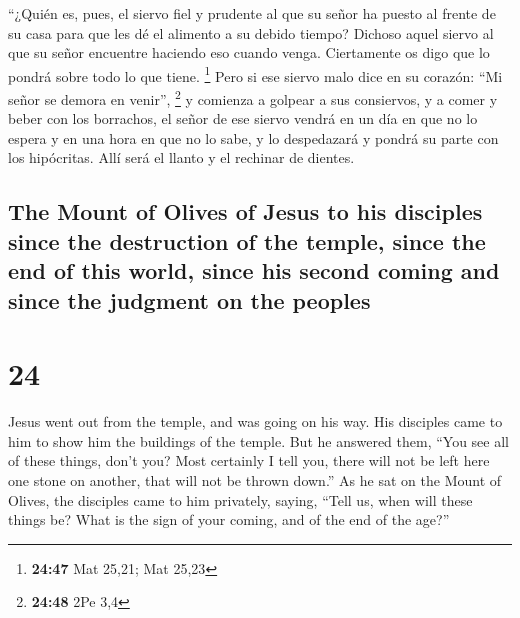 \begin{paracol}{2}
 ``¿Quién es, pues, el siervo fiel y prudente al que su
señor ha puesto al frente de su casa para que les dé el alimento a su
debido tiempo?  Dichoso aquel siervo al que su señor
encuentre haciendo eso cuando venga.  Ciertamente os digo
que lo pondrá sobre todo lo que tiene. \footnote{\textbf{24:47} Mat
  25,21; Mat 25,23}  Pero si ese siervo malo dice en su
corazón: ``Mi señor se demora en venir'', \footnote{\textbf{24:48} 2Pe
  3,4}  y comienza a golpear a sus consiervos, y a comer
y beber con los borrachos,  el señor de ese siervo vendrá
en un día en que no lo espera y en una hora en que no lo sabe,
 y lo despedazará y pondrá su parte con los hipócritas.
Allí será el llanto y el rechinar de dientes.

\switchcolumn
\begin{otherlanguage}{english}

\hypertarget{the-mount-of-olives-of-jesus-to-his-disciples-since-the-destruction-of-the-temple-since-the-end-of-this-world-since-his-second-coming-and-since-the-judgment-on-the-peoples}{%
\subsection{The Mount of Olives of Jesus to his disciples since the
destruction of the temple, since the end of this world, since his second
coming and since the judgment on the
peoples}\label{the-mount-of-olives-of-jesus-to-his-disciples-since-the-destruction-of-the-temple-since-the-end-of-this-world-since-his-second-coming-and-since-the-judgment-on-the-peoples}}

\hypertarget{section-47}{%
\section{24}\label{section-47}}

 Jesus went out from the temple, and was going on his way.
His disciples came to him to show him the buildings of the temple.
 But he answered them, ``You see all of these things,
don't you? Most certainly I tell you, there will not be left here one
stone on another, that will not be thrown down.''  As he
sat on the Mount of Olives, the disciples came to him privately, saying,
``Tell us, when will these things be? What is the sign of your coming,
and of the end of the age?''

\hypertarget{the-end-of-this-world-time-the-first-signs}{%
}
\end{otherlanguage}
\end{paracol}
